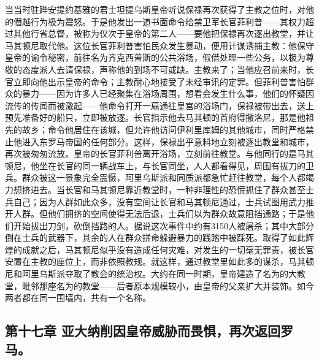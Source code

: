 当当时驻跸安提约基雅的君士坦提乌斯皇帝听说保禄再次获得了主教之位时，对他的僭越行为极为震怒。于是他发出一道书面命令给禁卫军长官菲利普——其权力超过其他行省总督，被称为仅次于皇帝的第二人——要他把保禄再次逐出教堂，并让马其顿尼取代他。这位长官菲利普害怕民众发生暴动，便用计谋诱捕主教：他保守皇帝的谕令秘密，前往名为齐克西普斯的公共浴场，假借处理一些公务，以极为尊敬的态度派人去请保禄，声称他的到场不可或缺。主教来了；当他应召前来时，长官立即向他出示皇帝的命令；主教耐心地接受了未经审讯的定罪。但菲利普害怕群众的暴力——因为许多人已经聚集在浴场周围，想看会发生什么事，他们的怀疑因流传的传闻而被激起——他命令打开一扇通往皇宫的浴场门，保禄被带出去，送上预先准备好的船只，立即被放逐。长官指示他去马其顿的首府得撒洛尼，那是他祖先的故乡；命令他居住在该城，但允许他访问伊利里库姆的其他城市，同时严格禁止他进入东罗马帝国的任何部分。这样，保禄出乎意料地立刻被逐出教堂和城市，再次被匆匆流放。皇帝的长官菲利普离开浴场，立刻前往教堂。与他同行的是马其顿尼，他坐在长官的同一辆战车上，与长官同坐，人人都看得见，周围有拔刀的卫兵。群众被这一景象完全震慑，阿里乌斯派和同质派都急忙赶往教堂，每个人都竭力想挤进去。当长官和马其顿尼靠近教堂时，一种非理性的恐慌抓住了群众甚至士兵自己；因为人群如此众多，没有空间让长官和马其顿尼通过，士兵试图用武力推开人群。但他们拥挤的空间使得无法后退，士兵们以为群众故意阻挡通路；于是他们开始拔出刀剑，砍倒挡路的人。据说这次事件中约有3150人被屠杀；其中大部分倒在士兵的武器下，其余的人在群众拼命躲避暴力的践踏中被踩死。取得了如此辉煌的成就之后，马其顿尼似乎没有造成任何灾难，对发生的一切毫无罪责，被长官安置在主教的座位上，而非依照教规。就这样，通过教堂里如此多的谋杀，马其顿尼和阿里乌斯派夺取了教会的统治权。大约在同一时期，皇帝建造了名为的大教堂，毗邻那座名为的教堂——后者原本规模较小，由皇帝的父亲扩大并装饰。如今两者都在同一围墙内，共有一个名称。\par


\subsection{第十七章 亚大纳削因皇帝威胁而畏惧，再次返回罗马。}

